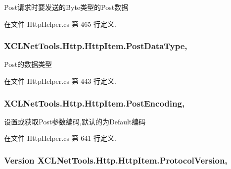 Post请求时要发送的\-Byte类型的\-Post数据 



在文件 Http\-Helper.\-cs 第 465 行定义.

\hypertarget{class_x_c_l_net_tools_1_1_http_1_1_http_item_abe960305b9cbbdf683e2fc100ce230b7}{
\subsubsection[{Post\-Data\-Type}]{ X\-C\-L\-Net\-Tools.\-Http.\-Http\-Item.\-Post\-Data\-Type\hspace{0.3cm}{\ttfamily [get]}, {\ttfamily [set]}}}\label{class_x_c_l_net_tools_1_1_http_1_1_http_item_abe960305b9cbbdf683e2fc100ce230b7}


Post的数据类型 



在文件 Http\-Helper.\-cs 第 443 行定义.

\hypertarget{class_x_c_l_net_tools_1_1_http_1_1_http_item_a75c55be0dc77b94b342b4360e0e4c6fa}{
\subsubsection[{Post\-Encoding}]{ X\-C\-L\-Net\-Tools.\-Http.\-Http\-Item.\-Post\-Encoding\hspace{0.3cm}{\ttfamily [get]}, {\ttfamily [set]}}}\label{class_x_c_l_net_tools_1_1_http_1_1_http_item_a75c55be0dc77b94b342b4360e0e4c6fa}


设置或获取\-Post参数编码,默认的为\-Default编码 



在文件 Http\-Helper.\-cs 第 641 行定义.

\hypertarget{class_x_c_l_net_tools_1_1_http_1_1_http_item_a3c18cc4172e07e7f957ed081ca371625}{
\subsubsection[{Protocol\-Version}]{\setlength{\rightskip}{0pt plus 5cm}Version X\-C\-L\-Net\-Tools.\-Http.\-Http\-Item.\-Protocol\-Version\hspace{0.3cm}{\ttfamily [get]}, {\ttfamily [set]}}}\label{class_x_c_l_net_tools_1_1_http_1_1_http_item_a3c18cc4172e07e7f957ed081ca371625}


